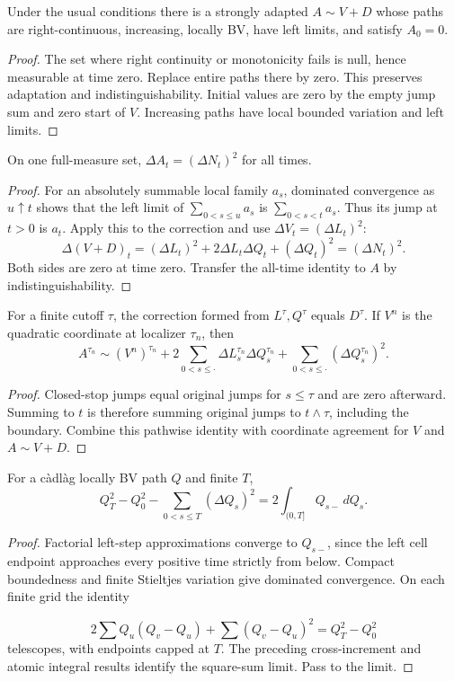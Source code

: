 \begin{lemma}
Under the usual conditions there is a strongly adapted $A\sim V+D$ whose
paths are right-continuous, increasing, locally BV, have left limits, and
satisfy $A_0=0$.
\end{lemma}
\begin{proof}
The set where right continuity or monotonicity fails is null, hence measurable
at time zero. Replace entire paths there by zero. This preserves adaptation
and indistinguishability. Initial values are zero by the empty jump sum and
zero start of $V$. Increasing paths have local bounded variation and left limits.
\end{proof}
\begin{lemma}
On one full-measure set, $\Delta A_t=(\Delta N_t)^2$ for all times.
\end{lemma}
\begin{proof}
For an absolutely summable local family $a_s$, dominated convergence as
$u\uparrow t$ shows that the left limit of $\sum_{0<s\leq u}a_s$ is
$\sum_{0<s<t}a_s$. Thus its jump at $t>0$ is $a_t$.
Apply this to the correction and use $\Delta V_t=(\Delta L_t)^2$:
\[
 \Delta(V+D)_t=(\Delta L_t)^2+2\Delta L_t\Delta Q_t+(\Delta Q_t)^2
 =(\Delta N_t)^2.
\]
Both sides are zero at time zero. Transfer the all-time identity to $A$
by indistinguishability.
\end{proof}
\begin{lemma}
For a finite cutoff $\tau$, the correction formed from $L^\tau,Q^\tau$ equals
$D^\tau$. If $V^n$ is the quadratic coordinate at localizer $\tau_n$, then
\[
 A^{\tau_n}\sim(V^n)^{\tau_n}
 +2\sum_{0<s\leq\cdot}\Delta L^{\tau_n}_s\Delta Q^{\tau_n}_s
 +\sum_{0<s\leq\cdot}(\Delta Q^{\tau_n}_s)^2.
\]
\end{lemma}
\begin{proof}
Closed-stop jumps equal original jumps for $s\leq\tau$ and are zero afterward.
Summing to $t$ is therefore summing original jumps to $t\wedge\tau$, including
the boundary. Combine this pathwise identity with coordinate agreement for
$V$ and $A\sim V+D$.
\end{proof}
\begin{lemma}
For a c\`adl\`ag locally BV path $Q$ and finite $T$,
\[
 Q_T^2-Q_0^2-\sum_{0<s\leq T}(\Delta Q_s)^2
 =2\int_{(0,T]}Q_{s-}\,dQ_s.
\]
\end{lemma}
\begin{proof}
Factorial left-step approximations converge to $Q_{s-}$, since the left cell
endpoint approaches every positive time strictly from below.
Compact boundedness and finite Stieltjes variation give dominated convergence.
On each finite grid the identity

\[
 2\sum Q_u(Q_v-Q_u)+\sum(Q_v-Q_u)^2=Q_T^2-Q_0^2
\]
 telescopes, with endpoints
capped at $T$. The preceding cross-increment and atomic integral results
identify the square-sum limit. Pass to the limit.
\end{proof}
